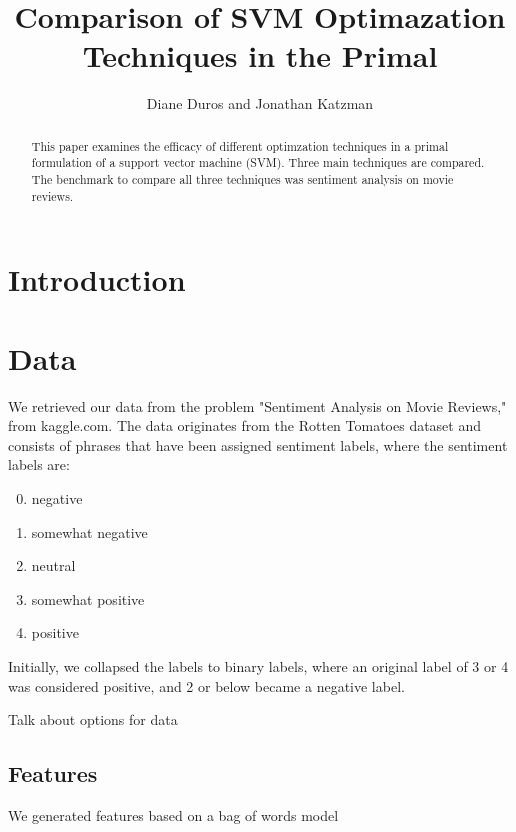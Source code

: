\documentclass[letterpaper, 11pt]{article}
\begin{document}
\title{Comparison of SVM Optimazation Techniques in the Primal}
\author{Diane Duros and Jonathan Katzman}
\maketitle
\begin{abstract}This paper examines the efficacy of different optimzation techniques in a primal formulation of a support vector machine (SVM).  Three main techniques are compared.  The benchmark to compare all three techniques was sentiment analysis on movie reviews.
\end{abstract}
                                                                                                                                                                                                                                                                           
\section{Introduction}


\section{Data}
We retrieved our data from the problem "Sentiment Analysis on Movie Reviews," from kaggle.com.  The data originates from the Rotten Tomatoes dataset and consists of phrases that have been assigned sentiment labels, where the sentiment labels are:
\begin{enumerate}
	\setcounter{enumi}{-1}
	\item negative
	\item somewhat negative
	\item neutral
	\item somewhat positive
	\item positive
\end{enumerate}

Initially, we collapsed the labels to binary labels, where an original label of 3 or 4 was considered positive, and 2 or below became a negative label.  

Talk about options for data

\subsection{Features}
We generated features based on a bag of words model
\end{document}
